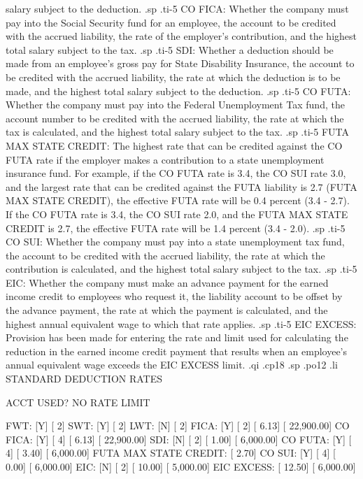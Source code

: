 salary subject
to the deduction.
.sp
.ti-5
CO FICA: Whether the company must pay into the Social Security fund for
an employee, the account to be credited with the accrued liability,
the rate of the
employer's contribution, and the highest total salary subject to the tax.
.sp
.ti-5
SDI: Whether a deduction should be made from an employee's gross pay
for State Disability Insurance, the account to be credited with the
accrued liability, the rate at which the deduction is to be made,
and the highest total salary subject to the deduction.
.sp
.ti-5
CO FUTA: Whether the company must pay into the Federal Unemployment
Tax fund, the account number to be credited with the accrued
liability, the rate
at which the tax is calculated, and the highest total
salary subject to the tax.
.sp
.ti-5
FUTA MAX STATE CREDIT: The highest rate that can be credited against the
CO FUTA rate if the employer makes a contribution to a state unemployment
insurance fund.  For example, if the CO FUTA rate is 3.4, the CO SUI
rate 3.0, and the largest rate that can be credited against the
FUTA liability is 2.7 (FUTA MAX STATE CREDIT), the effective FUTA
rate will be 0.4 percent (3.4 - 2.7).  If the CO FUTA rate is 3.4,
the CO SUI rate 2.0, and the FUTA MAX STATE CREDIT is 2.7, the effective
FUTA rate will be 1.4 percent (3.4 - 2.0).
.sp
.ti-5
CO SUI: Whether the company must pay into a state unemployment tax fund,
the account to be credited with the accrued liability, the rate at which the
contribution is calculated, and the highest total salary subject to the tax.
.sp
.ti-5
EIC: Whether the company must make an advance payment for the earned
income credit to employees who request it,
the liability account to be offset by the advance payment,
the rate at which the payment is calculated, and the highest annual equivalent
wage to which
that rate applies.
.sp
.ti-5
EIC EXCESS: Provision has been made for entering the rate and limit
used for calculating the reduction in the earned income credit payment
that results when an employee's annual equivalent wage exceeds the
EIC EXCESS limit.
.qi
.cp18
.sp
.po12
.li
		 STANDARD DEDUCTION RATES

		  ACCT
	   USED?   NO	      RATE	    LIMIT

   FWT:     [Y]   [  2]
   SWT:     [Y]   [  2]
   LWT:     [N]   [  2]
   FICA:    [Y]   [  2]    [   6.13]  [   22,900.00]
   CO FICA: [Y]   [  4]    [   6.13]  [   22,900.00]
   SDI:     [N]   [  2]    [   1.00]  [    6,000.00]
   CO FUTA: [Y]   [  4]    [   3.40]  [    6,000.00]
   FUTA MAX STATE CREDIT:  [   2.70]
   CO SUI:  [Y]   [  4]    [   0.00]  [    6,000.00]
   EIC:     [N]   [  2]    [  10.00]  [    5,000.00]
   EIC EXCESS:		   [  12.50]  [    6,000.00]

